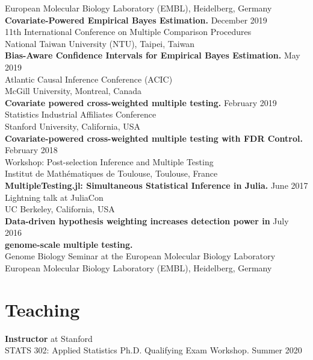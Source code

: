 \documentclass[margin,line]{res}
\begin{document}
\begin{resume}
European Molecular Biology Laboratory (EMBL), Heidelberg, Germany\\
\textbf{Covariate-Powered Empirical Bayes Estimation.} \hfill December 2019\\
11th International Conference on Multiple Comparison Procedures\\
National Taiwan University (NTU), Taipei, Taiwan\\
\textbf{Bias-Aware Confidence Intervals for Empirical Bayes Estimation.} \hfill May 2019\\
Atlantic Causal Inference Conference (ACIC)\\
McGill University, Montreal, Canada\\
\textbf{Covariate powered cross-weighted multiple testing.} \hfill February 2019\\
Statistics Industrial Affiliates Conference\\
Stanford University, California, USA\\
\textbf{Covariate-powered cross-weighted multiple testing with FDR Control.} \hfill February 2018\\
Workshop: Post-selection Inference and Multiple Testing\\
Institut de Mathématiques de Toulouse, Toulouse, France\\
\textbf{MultipleTesting.jl: Simultaneous Statistical Inference in Julia.} \hfill June 2017\\
Lightning talk at JuliaCon\\
UC Berkeley, California, USA\\
\textbf{Data-driven hypothesis weighting increases detection power in} \hfill July 2016\\
\textbf{genome-scale multiple testing.}\\
Genome Biology Seminar at the European Molecular Biology Laboratory\\
European Molecular Biology Laboratory (EMBL), Heidelberg, Germany



\section{\sc Teaching}
\textbf{Instructor} at Stanford\\
STATS 302: Applied Statistics Ph.D. Qualifying Exam Workshop. \hfill Summer 2020


\end{resume}
\end{document}
